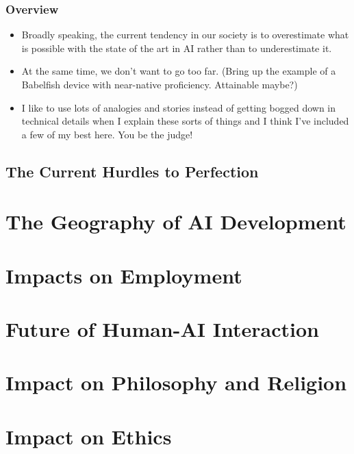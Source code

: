 \documentclass[10pt]{beamer}
\begin{document}
  \begin{frame}
    \frametitle{Overview}

    \begin{itemize}
      \item Broadly speaking, the current tendency in our society is to
        overestimate what is possible with the state of the art in AI rather
        than to underestimate it.
      \pause
      \item At the same time, we don't want to go too far. (Bring up the
        example of a Babelfish device with near-native proficiency.
        Attainable maybe?)
      \pause
      \item I like to use lots of analogies and stories instead of getting
        bogged down in technical details when I explain these sorts of things
        and I think I've included a few of my best here. You be the judge!
    \end{itemize}
  \end{frame}

  \subsection{The Current Hurdles to Perfection}


  \section{The Geography of AI Development}
  \section{Impacts on Employment}
  \section{Future of Human-AI Interaction}
  \section{Impact on Philosophy and Religion}
  \section{Impact on Ethics}
\end{document}

